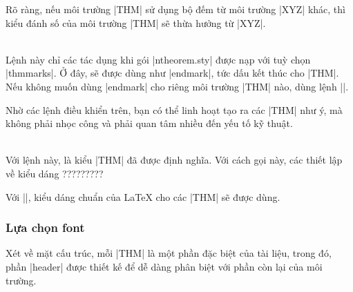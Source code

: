 \documentclass[11pt,oneside]{ltxdoc}
\theoremstyle{marginbreak}
\theoremstyle{changebreak}
\theoremstyle{change}
\theoremstyle{plain}
\theoremstyle{nonumberplain}
\begin{document}
\begin{description}
	Rõ ràng, nếu môi trường |THM| sử dụng bộ đếm từ môi trường |XYZ| khác,
	thì kiểu đánh số của môi trường |THM| sẽ thừa hưởng từ |XYZ|.
\item
\DescribeMacro\theoremsymbol
  \\
	Lệnh này chỉ các tác dụng khi gói |ntheorem.sty| được nạp với tuỳ chọn |thmmarks|.
	Ở đây,  sẽ được dùng như |endmark|, tức dấu kết thúc cho |THM|.
	Nếu không muốn dùng |endmark| cho riêng môi trường |THM| nào, 
	dùng lệnh |\theoremsymbol{}|.
\end{description}

Nhờ các lệnh điều khiển trên, bạn có thể linh hoạt tạo ra các |THM| như ý,
mà không phải nhọc công và phải quan tâm nhiều đến yếu tố kỹ thuật.

\medskip
\DescribeMacro\theoremclass{}\\
Với lệnh này,  là kiểu |THM| đã được định nghĩa.
Với cách gọi này, các thiết lập về kiểu dáng ?????????

Với ||, kiểu dáng chuẩn của \LaTeX{} cho các |THM|
sẽ được dùng.

\subsubsection{Lựa chọn font}

Xét về mặt cấu trúc, mỗi |THM| là một phần đặc biệt
của tài liệu, trong đó, phần |header| được thiết kế để dễ dàng
phân biệt với phần còn lại của môi trường.
\end{document}
